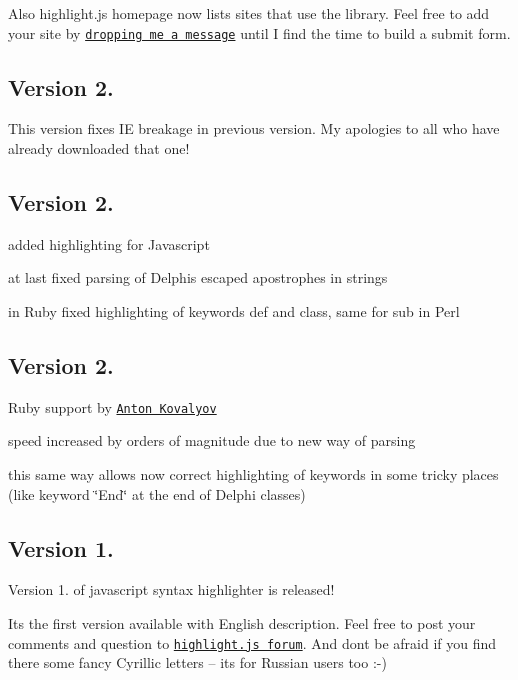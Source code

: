 Also highlight.\+js homepage now lists sites that use the library. Feel free to add your site by \href{mailto:Maniac@SoftwareManiacs.Org}{\tt dropping me a message} until I find the time to build a submit form.

\subsection*{Version 2.}

This version fixes IE breakage in previous version. My apologies to all who have already downloaded that one!

\subsection*{Version 2.}


\begin{DoxyItemize}
\item added highlighting for Javascript
\item at last fixed parsing of Delphi\textquotesingle{}s escaped apostrophes in strings
\item in Ruby fixed highlighting of keywords \textquotesingle{}def\textquotesingle{} and \textquotesingle{}class\textquotesingle{}, same for \textquotesingle{}sub\textquotesingle{} in Perl
\end{DoxyItemize}

\subsection*{Version 2.}


\begin{DoxyItemize}
\item Ruby support by \href{http://anton.kovalyov.net/}{\tt Anton Kovalyov}
\item speed increased by orders of magnitude due to new way of parsing
\item this same way allows now correct highlighting of keywords in some tricky places (like keyword \char`\"{}\+End\char`\"{} at the end of Delphi classes)
\end{DoxyItemize}

\subsection*{Version 1.}

Version 1. of javascript syntax highlighter is released!

It\textquotesingle{}s the first version available with English description. Feel free to post your comments and question to \href{http://softwaremaniacs.org/forum/viewforum.php?id=6}{\tt highlight.\+js forum}. And don\textquotesingle{}t be afraid if you find there some fancy Cyrillic letters -- it\textquotesingle{}s for Russian users too \+:-\/) 